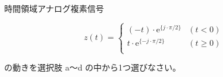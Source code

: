 時間領域アナログ複素信号 

\[
z(t) = 
\begin{cases}
(-t) \cdot \textrm{e}^{\{j\cdot \pi/2 \}} & (t < 0)  \\
t \cdot \textrm{e}^{\{-j\cdot \pi/2 \}} & (t \geq 0)  \\
\end{cases}
\]

\medskip
\noindent の動きを選択肢 a〜d の中から1つ選びなさい。

